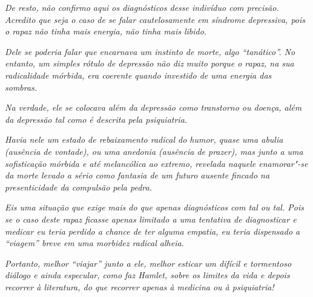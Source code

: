\emph{De resto, não confirmo aqui os diagnósticos desse indivíduo com
precisão. Acredito que seja o caso de se falar cautelosamente em
síndrome depressiva, pois o rapaz não tinha mais energia, não tinha mais
libido.}~

\emph{Dele se poderia falar que encarnava um instinto de morte, algo
``tanático''. No entanto, um simples rótulo de depressão não diz muito
porque o rapaz, na sua radicalidade mórbida, era coerente quando
investido de uma energia das sombras.}~

\emph{Na verdade, ele se colocava além da depressão como transtorno ou
doença, além da depressão tal como é descrita pela psiquiatria.}~

\emph{Havia nele um estado de rebaixamento radical do humor, quase uma
abulia (ausência de vontade), ou uma anedonia (ausência de prazer), mas
junto a uma sofisticação mórbida e até melancólica ao extremo, revelada
naquele enamorar"-se da morte levado a sério como fantasia de um futuro
ausente fincado na presenticidade da compulsão pela pedra.}~

\emph{Eis uma situação que exige mais do que apenas diagnósticos com 
tal ou  tal. Pois se o caso deste rapaz ficasse apenas limitado a uma
tentativa de diagnosticar e medicar eu teria perdido a chance de ter
alguma empatia, eu teria dispensado a ``viagem'' breve em uma morbidez
radical alheia.}~

\emph{Portanto, melhor ``viajar'' junto a ele, melhor esticar um difícil
e tormentoso diálogo e ainda especular, como faz Hamlet, sobre os
limites da vida e depois recorrer à literatura, do que recorrer apenas à
medicina ou à psiquiatria!~}~
\endgroup
